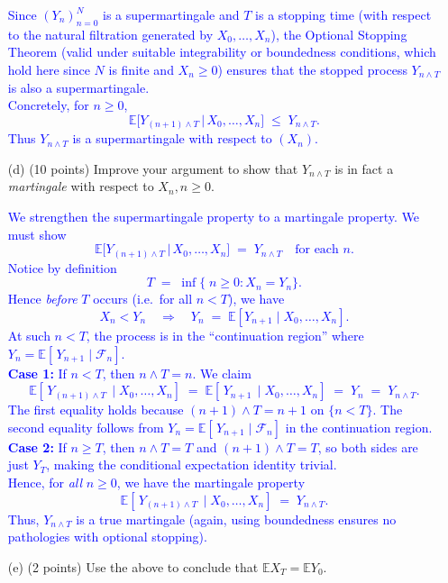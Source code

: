 \documentclass{article}
\begin{document}
\begin{enumerate}
        \textcolor{blue}{
            Since $(Y_n)_{n=0}^N$ is a supermartingale and $T$ is a stopping time (with respect to the natural filtration generated by $X_0,\ldots,X_n$), the Optional Stopping Theorem (valid under suitable integrability or boundedness conditions, which hold here since $N$ is finite and $X_n \ge0$) ensures that the stopped process $Y_{n \wedge T}$ is also a supermartingale. \\
Concretely, for $n \ge 0$,
\[
\mathbb{E}\bigl[Y_{(n+1)\wedge T} \,\big\vert\, X_0,\ldots,X_n\bigr]
\;\le\;
Y_{n \wedge T}.
\]
Thus $Y_{n\wedge T}$ is a supermartingale with respect to $(X_n)$.
        }
    
    \item[(d)] (10 points) Improve your argument to show that $Y_{n \wedge T}$ is in fact a \textit{martingale} with respect to $X_n, n \geq 0$.

        \textcolor{blue}{
            We strengthen the supermartingale property to a martingale property. We must show
\[
\mathbb{E}\bigl[Y_{(n+1)\wedge T} \,\big\vert\, X_0,\ldots,X_n\bigr]
\;=\;
Y_{n \wedge T}
\quad
\text{for each } n.
\]
Notice by definition
\[
T \;=\;\inf\{\; n \ge 0 : X_n = Y_n \}.
\]
Hence \emph{before} $T$ occurs (i.e.\ for all $n < T$), we have 
\[
X_n < Y_n
\quad\Longrightarrow\quad
Y_n \;=\;\mathbb{E}[Y_{n+1}\mid X_0,\ldots,X_n].
\]
At such $n<T$, the process is in the ``continuation region'' where $Y_n = \mathbb{E}[\,Y_{n+1}\mid \mathcal{F}_n]$.  \\ 
\textbf{Case 1:} If $n < T$, then $n\wedge T = n$. We claim
\[
\mathbb{E}[\,Y_{(n+1)\wedge T}\,\mid X_0,\ldots,X_n]
\;=\;
\mathbb{E}[\,Y_{n+1}\,\mid X_0,\ldots,X_n]
\;=\;
Y_n
\;=\;
Y_{n\wedge T}.
\]
The first equality holds because $(n+1)\wedge T = n+1$ on $\{n < T\}$. The second equality follows from $Y_n = \mathbb{E}[\,Y_{n+1}\mid \mathcal{F}_n]$ in the continuation region. \\ 
\textbf{Case 2:} If $n \ge T$, then $n\wedge T = T$ and $(n+1)\wedge T = T$, so both sides are just $Y_T$, making the conditional expectation identity trivial. \\ 
Hence, for \emph{all} $n\ge 0$, we have the martingale property
\[
\mathbb{E}[\,Y_{(n+1)\wedge T}\,\mid X_0,\ldots,X_n]
\;=\;
Y_{n\wedge T}.
\]
Thus, $Y_{n\wedge T}$ is a true martingale (again, using boundedness ensures no pathologies with optional stopping).
        }
    
    \item[(e)] (2 points) Use the above to conclude that $\mathbb{E}X_T = \mathbb{E}Y_0$.


\end{enumerate}
\end{document}
